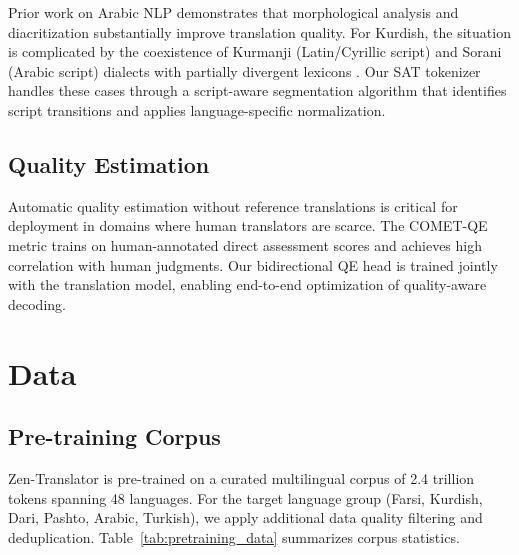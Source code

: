 \documentclass[11pt,twocolumn]{article}
\begin{document}
Prior work on Arabic NLP \citep{habash2010introduction} demonstrates that
morphological analysis and diacritization substantially improve translation
quality. For Kurdish, the situation is complicated by the coexistence of
Kurmanji (Latin/Cyrillic script) and Sorani (Arabic script) dialects with
partially divergent lexicons \citep{hassanpour2012kurdish}. Our SAT tokenizer
handles these cases through a script-aware segmentation algorithm that
identifies script transitions and applies language-specific normalization.

\subsection{Quality Estimation}

Automatic quality estimation without reference translations \citep{specia2021findings}
is critical for deployment in domains where human translators are scarce. The
COMET-QE metric \citep{rei2020comet} trains on human-annotated direct assessment
scores and achieves high correlation with human judgments. Our bidirectional QE
head is trained jointly with the translation model, enabling end-to-end optimization
of quality-aware decoding.

\section{Data}
\label{sec:data}

\subsection{Pre-training Corpus}

Zen-Translator is pre-trained on a curated multilingual corpus of 2.4 trillion
tokens spanning 48 languages. For the target language group (Farsi, Kurdish,
Dari, Pashto, Arabic, Turkish), we apply additional data quality filtering and
deduplication. Table~\ref{tab:pretraining_data} summarizes corpus statistics.
\end{document}
